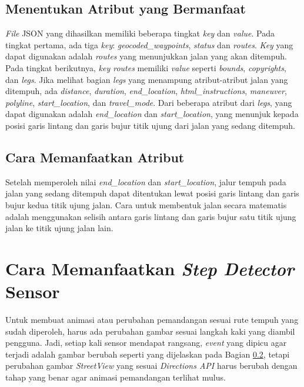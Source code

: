 \subsection{Menentukan Atribut yang Bermanfaat}
\textit{File} JSON yang dihasilkan memiliki beberapa tingkat \textit{key} dan \textit{value}. Pada tingkat pertama, ada tiga \textit{key}: \textit{geocoded\_waypoints}, \textit{status} dan \textit{routes}. \textit{Key} yang dapat digunakan adalah \textit{routes} yang menunjukkan jalan yang akan ditempuh. Pada tingkat berikutnya, \textit{key routes} memiliki \textit{value} seperti \textit{bounds}, \textit{copyrights}, dan \textit{legs}. Jika melihat bagian \textit{legs} yang menampung atribut-atribut jalan yang ditempuh, ada {\it distance}, {\it duration}, {\it end\_location}, {\it html\_instructions}, {\it maneuver}, {\it polyline}, {\it start\_location}, dan \textit{travel\_mode}. Dari beberapa atribut dari \textit{legs}, yang dapat digunakan adalah \textit{end\_location} dan \textit{start\_location}, yang menunjuk kepada posisi garis lintang dan garis bujur titik ujung dari jalan yang sedang ditempuh. 

\subsection{Cara Memanfaatkan Atribut}
\label{subs:directions-attr-use}
Setelah memperoleh nilai \textit{end\_location} dan \textit{start\_location}, jalur tempuh pada jalan yang sedang ditempuh dapat ditentukan lewat posisi garis lintang dan garis bujur kedua titik ujung jalan. Cara untuk membentuk jalan secara matematis adalah menggunakan selisih antara garis lintang dan garis bujur satu titik ujung jalan ke titik ujung jalan lain. 


\section{Cara Memanfaatkan \textit{Step Detector} Sensor}
Untuk membuat animasi atau perubahan pemandangan sesuai rute tempuh yang sudah diperoleh, harus ada perubahan gambar sesuai langkah kaki yang diambil pengguna. Jadi, setiap kali sensor mendapat rangsang, \textit{event} yang dipicu agar terjadi adalah gambar berubah seperti yang dijelaskan pada Bagian \ref{subs:directions-attr-use}, tetapi perubahan gambar \textit{StreetView} yang sesuai \textit{Directions API} harus berubah dengan tahap yang benar agar animasi pemandangan terlihat mulus.